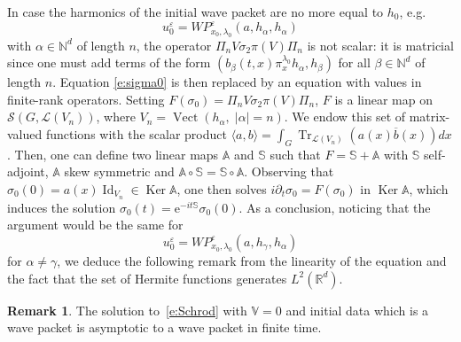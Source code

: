 \documentclass[10pt]{amsart}
\let\mathcal\mathscr
\newcommand{\rme}{\mathrm{e}}
\DeclareMathOperator{\Id}{Id}
\DeclareMathOperator{\Ker}{Ker}
\DeclareMathOperator{\Tr}{Tr}
\DeclareMathOperator{\Vect}{Vect}
\theoremstyle{plain}
\theoremstyle{definition}
\newtheorem{remark}[theorem]{Remark}
\let\eps\varepsilon
\def\R{{\mathbb R}}
\def\N{{\mathbb N}}
\def\bbV{{\mathbb V}}
\def\bbA{{\mathbb A}}
\def\bbS{{\mathbb S}}
\providecommand{\eg}{e.g.}\providecommand{\ie}{i.e.}\providecommand{\etc}{etc.}
\begin{document}
In case the harmonics of the initial wave packet are no more equal to $h_0$, \eg
\[
u^\eps_0= WP^\eps_{x_0,\lambda_0} (a,h_\alpha,h_\alpha)
\]
with $\alpha\in\N^d$ of length $n$, the operator $\Pi_n V\sigma_2 \pi(V) \Pi_n$ is not scalar: it is matricial since one must add terms of the form $(b_\beta(t,x) \pi^{\lambda_0}_x h_\alpha, h_\beta)$ for all $\beta\in\N^d$ of length $n$. Equation \eqref{e:sigma0} is then replaced by an equation with values in finite-rank operators. Setting $F(\sigma_0)=\Pi_n V\sigma_2 \pi(V) \Pi_n$, $F$ is a linear map on~${\mathcal S}(G, \mathcal L(V_n))$, where $V_n=\Vect (h_\alpha,\;|\alpha|=n)$. We endow this set of matrix-valued functions with the scalar product $\langle a, b\rangle =\int_G \Tr_{ \mathcal L(V_n)} (a(x)\overline b(x)) dx$. Then, one can define two linear maps $\bbA$ and $\bbS$ such that $F=\bbS+\bbA$ with $\bbS$ self-adjoint, $\bbA$ skew symmetric and $\bbA\circ \bbS=\bbS \circ \bbA$. Observing that $\sigma_0(0)= a(x) \Id_{V_n}\in \Ker \bbA $, one then solves $i\partial_t \sigma_0= F(\sigma_0)$ in $\Ker \bbA $, which induces the solution $\sigma_0(t) = \rme^{-it\bbS} \sigma_0(0)$. As a conclusion, noticing that the argument would be the same for
\[
u^\eps_0= WP^\eps_{x_0,\lambda_0} (a,h_\gamma,h_\alpha)
\]
for $\alpha\not=\gamma$, we deduce the following remark from the linearity of the equation and the fact that the set of Hermite functions generates $L^2(\R^d)$.
\begin{remark} \label{r:profiles}
The solution to~\eqref{e:Schrod} with $\bbV=0$ and initial data which is a wave packet is asymptotic to a wave packet in finite time.
\end{remark}
\end{document}
